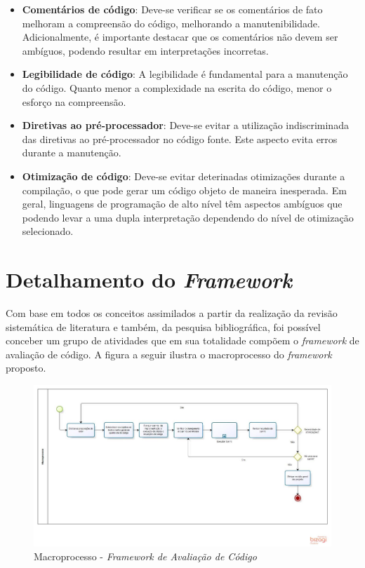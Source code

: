\begin{itemize}
	\item \textbf{Comentários de código}: Deve-se verificar se os comentários de fato melhoram a compreensão do código, melhorando a manutenibilidade. Adicionalmente, é importante destacar que os comentários não devem ser ambíguos, podendo resultar em interpretações incorretas.

	\item \textbf{Legibilidade de código}: A legibilidade é fundamental para a manutenção do código. Quanto menor a complexidade na escrita do código, menor o esforço na compreensão.

	\item \textbf{Diretivas ao pré-processador}: Deve-se evitar a utilização indiscriminada das diretivas ao pré-processador no código fonte. Este aspecto evita erros durante a manutenção.

	\item \textbf{Otimização de código}: Deve-se evitar deterinadas otimizações durante a compilação, o que pode gerar um código objeto de maneira inesperada. Em geral, linguagens de programação de alto nível têm aspectos ambíguos que podendo levar a uma dupla interpretação dependendo do nível de otimização selecionado.
\end{itemize}

\section{Detalhamento do \textit{Framework}}

Com base em todos os conceitos assimilados a partir da realização da revisão sistemática de literatura e também, da pesquisa bibliográfica, foi possível conceber um grupo de atividades que em sua totalidade compõem o \textit{framework} de avaliação de código. A figura a seguir ilustra o macroprocesso do \textit{framework} proposto.

\begin{figure}[h]
\includegraphics[width=\textwidth]{figuras/macroprocesso.jpg}
\caption{Macroprocesso - \textit{Framework de Avaliação de Código}}
\end{figure}

